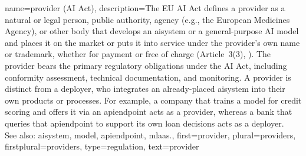 {name={provider (AI Act)},
	description={The EU AI Act defines a provider 
		as a natural or legal person, public
		authority, agency (e.g., the European Medicines Agency), or other body
		that develops an \gls{aisystem} or a
		general-purpose AI \gls{model} and places it on the market or puts it
		into service under the provider's own name or trademark, whether for payment
		or free of charge (Article~3(3), \cite{EUAIAct2024}).
		The provider bears the primary regulatory obligations under the AI Act,
		including conformity assessment, technical documentation, and monitoring.
		A provider is distinct from a deployer, who integrates an already-placed
		\gls{aisystem} into their own products or processes.
		For example, a company that trains a \gls{model} for credit scoring
		and offers it via an \gls{apiendpoint} acts as a provider, whereas
		a bank that queries that \gls{apiendpoint} to support its own loan
		decisions acts as a deployer.
		\\
		See also: \gls{aisystem}, \gls{model}, \gls{apiendpoint}, \gls{mlaas}.},
	first={provider},
	plural={providers},
	firstplural={providers},
	type=regulation,
	text={provider}
}






